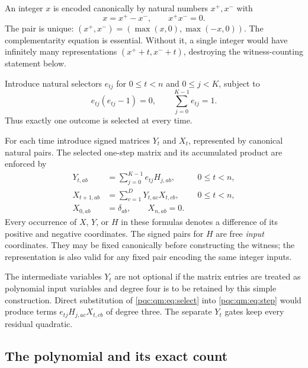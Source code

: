\documentclass[11pt,letterpaper]{article}
\numberwithin{equation}{section}
\theoremstyle{definition}
\theoremstyle{remark}
\begin{document}
An integer $x$ is encoded canonically by natural numbers $x^+,x^-$ with
\begin{equation}
 x=x^+-x^-,\qquad x^+x^-=0.
 \label{pqc:qm:eq:canonical}
\end{equation}
The pair is unique: $(x^+,x^-)=(\max(x,0),\max(-x,0))$. The complementarity equation is essential. Without it, a single integer would have infinitely many representations $(x^++t,x^-+t)$, destroying the witness-counting statement below.

Introduce natural selectors $e_{tj}$ for $0\leq t<n$ and $0\leq j<K$, subject to
\begin{equation}
 e_{tj}(e_{tj}-1)=0,\qquad \sum_{j=0}^{K-1}e_{tj}=1.
 \label{pqc:qm:eq:onehot}
\end{equation}
Thus exactly one outcome is selected at every time.

For each time introduce signed matrices $Y_t$ and $X_t$, represented by canonical natural pairs. The selected one-step matrix and its accumulated product are enforced by
\begin{align}
 Y_{t,ab}&=\sum_{j=0}^{K-1}e_{tj}H_{j,ab},
 &&0\leq t<n,\label{pqc:qm:eq:select}\\
 X_{t+1,ab}&=\sum_{c=1}^{D}Y_{t,ac}X_{t,cb},
 &&0\leq t<n,\label{pqc:qm:eq:step}\\
 X_{0,ab}&=\delta_{ab},\qquad X_{n,ab}=0.
 &&\label{pqc:qm:eq:endpoints}
\end{align}
Every occurrence of $X$, $Y$, or $H$ in these formulas denotes a difference of its positive and negative coordinates. The signed pairs for $H$ are free \emph{input} coordinates. They may be fixed canonically before constructing the witness; the representation is also valid for any fixed pair encoding the same integer inputs.

The intermediate variables $Y_t$ are not optional if the matrix entries are treated as polynomial input variables and degree four is to be retained by this simple construction. Direct substitution of \eqref{pqc:qm:eq:select} into \eqref{pqc:qm:eq:step} would produce terms $e_{tj}H_{j,ac}X_{t,cb}$ of degree three. The separate $Y_t$ gates keep every residual quadratic.

\subsection{The polynomial and its exact count}
\end{document}
